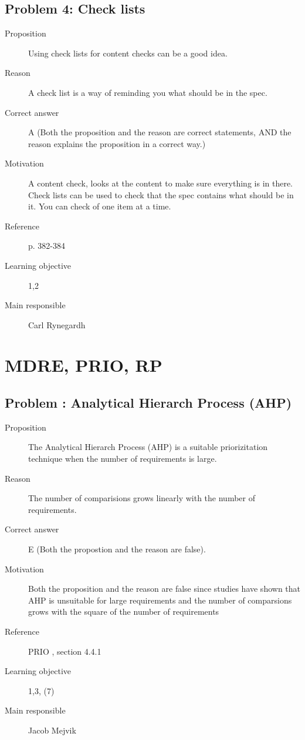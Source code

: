 \documentclass[10pt,a4paper]{article}
\begin{document}
\subsection*{Problem 4: Check lists}
\begin{description}
\item[Proposition] Using check lists for content checks can be a good idea.
\item[Reason] A check list is a way of reminding you what should be in the spec.
\item[Correct answer] A (Both the proposition and the reason are correct statements,
AND the reason explains the proposition in a correct way.)
\item[Motivation] A content check, looks at the content to make sure everything is in there. Check lists can be used to check that the spec contains what should be in it. You can check of one item at a time.
\item[Reference] p. 382-384
\item[Learning objective] 1,2
\item[Main responsible] Carl Rynegardh
\end{description}

\section*{MDRE, PRIO, RP}
\subsection*{Problem : Analytical Hierarch Process (AHP)}
\begin{description}
\item[Proposition] The Analytical Hierarch Process (AHP) is a suitable priorizitation technique when the number of requirements is large. 
\item[Reason] The number of comparisions grows linearly with the number of requirements.  
\item[Correct answer] E (Both the propostion and the reason are false).  
\item[Motivation] Both the proposition and the reason are false since studies have shown that AHP is unsuitable for large requirements and the number of comparsions grows with the square of the number of requirements 
\item[Reference] PRIO , section 4.4.1
\item[Learning objective] 1,3, (7)
\item[Main responsible] Jacob Mejvik
\end{description}
\end{document}
